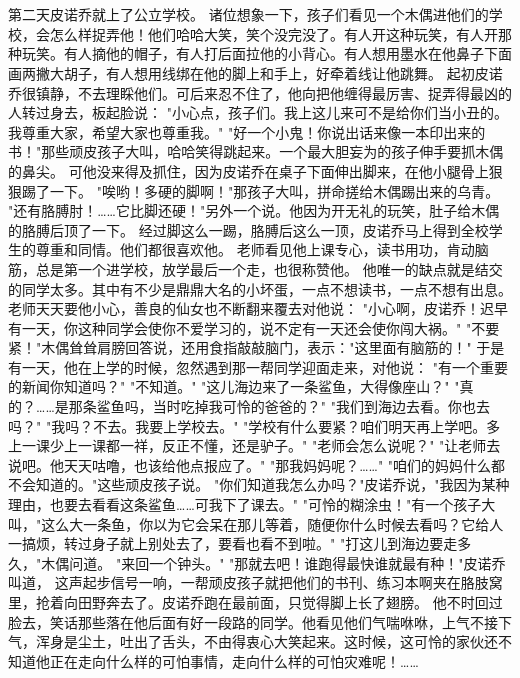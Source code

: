 \documentclass[12pt,UTF8]{ctexbook}
\begin{document}
\chapter{}

第二天皮诺乔就上了公立学校。
诸位想象一下，孩子们看见一个木偶进他们的学校，会怎么样捉弄他！他们哈哈大笑，笑个没完没了。有人开这种玩笑，有人开那种玩笑。有人摘他的帽子，有人打后面拉他的小背心。有人想用墨水在他鼻子下面画两撇大胡子，有人想用线绑在他的脚上和手上，好牵着线让他跳舞。
起初皮诺乔很镇静，不去理睬他们。可后来忍不住了，他向把他缠得最厉害、捉弄得最凶的人转过身去，板起脸说：
"小心点，孩子们。我上这儿来可不是给你们当小丑的。我尊重大家，希望大家也尊重我。"
"好一个小鬼！你说出话来像一本印出来的书！"那些顽皮孩子大叫，哈哈笑得跳起来。一个最大胆妄为的孩子伸手要抓木偶的鼻尖。
可他没来得及抓住，因为皮诺乔在桌子下面伸出脚来，在他小腿骨上狠狠踢了一下。
"唉哟！多硬的脚啊！"那孩子大叫，拼命搓给木偶踢出来的乌青。
"还有胳膊肘！……它比脚还硬！"另外一个说。他因为开无礼的玩笑，肚子给木偶的胳膊后顶了一下。
经过脚这么一踢，胳膊后这么一顶，皮诺乔马上得到全校学生的尊重和同情。他们都很喜欢他。
老师看见他上课专心，读书用功，肯动脑筋，总是第一个进学校，放学最后一个走，也很称赞他。
他唯一的缺点就是结交的同学太多。其中有不少是鼎鼎大名的小坏蛋，一点不想读书，一点不想有出息。
老师天天要他小心，善良的仙女也不断翻来覆去对他说：
"小心啊，皮诺乔！迟早有一天，你这种同学会使你不爱学习的，说不定有一天还会使你闯大祸。"
"不要紧！"木偶耸耸肩膀回答说，还用食指敲敲脑门，表示："这里面有脑筋的！"
于是有一天，他在上学的时候，忽然遇到那一帮同学迎面走来，对他说：
"有一个重要的新闻你知道吗？"
"不知道。"
"这儿海边来了一条鲨鱼，大得像座山？"
"真的？……是那条鲨鱼吗，当时吃掉我可怜的爸爸的？"
"我们到海边去看。你也去吗？"
"我吗？不去。我要上学校去。"
"学校有什么要紧？咱们明天再上学吧。多上一课少上一课都一祥，反正不懂，还是驴子。"
"老师会怎么说呢？"
"让老师去说吧。他天天咕噜，也该给他点报应了。"
"那我妈妈呢？……"
"咱们的妈妈什么都不会知道的。"这些顽皮孩子说。
"你们知道我怎么办吗？"皮诺乔说，"我因为某种理由，也要去看看这条鲨鱼……可我下了课去。"
"可怜的糊涂虫！"有一个孩子大叫，"这么大一条鱼，你以为它会呆在那儿等着，随便你什么时候去看吗？它给人一搞烦，转过身子就上别处去了，要看也看不到啦。"
"打这儿到海边要走多久，"木偶问道。
"来回一个钟头。"
"那就去吧！谁跑得最快谁就最有种！"皮诺乔叫道，
这声起步信号一响，一帮顽皮孩子就把他们的书刊、练习本啊夹在胳肢窝里，抢着向田野奔去了。皮诺乔跑在最前面，只觉得脚上长了翅膀。
他不时回过脸去，笑话那些落在他后面有好一段路的同学。他看见他们气喘咻咻，上气不接下气，浑身是尘土，吐出了舌头，不由得衷心大笑起来。这时候，这可怜的家伙还不知道他正在走向什么样的可怕事情，走向什么样的可怕灾难呢！……
\end{document}
